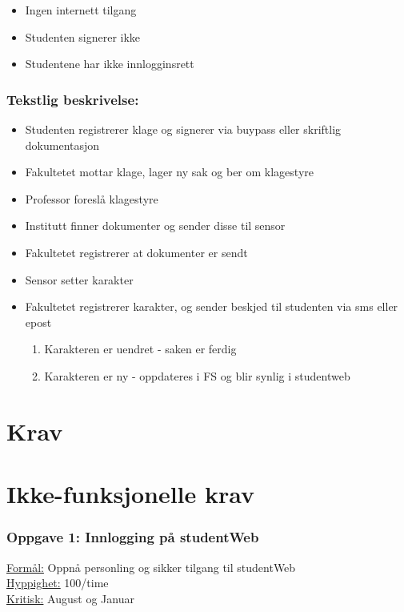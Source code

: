 \documentclass[12pt]{article}
\begin{document}
\begin{itemize}
\item Ingen internett tilgang
\item Studenten signerer ikke
\item Studentene har ikke innlogginsrett
\end{itemize}

\subsubsection*{Tekstlig beskrivelse:}

\begin{itemize}
\item Studenten registrerer klage og signerer via buypass eller skriftlig dokumentasjon
\item Fakultetet mottar klage, lager ny sak og ber om klagestyre
\item Professor foreslå klagestyre
\item Institutt finner dokumenter og sender disse til sensor
\item Fakultetet registrerer at dokumenter er sendt
\item Sensor setter karakter
\item Fakultetet registrerer karakter, og sender beskjed til studenten via sms eller epost
\begin{enumerate}
\item Karakteren er uendret - saken er ferdig
\item Karakteren er ny - oppdateres i FS og blir synlig i studentweb
\end{enumerate}
\end{itemize}


\section{Krav}

\section{Ikke-funksjonelle krav}

\subsubsection*{Oppgave 1: Innlogging på studentWeb}

\underline{Formål:} Oppnå personling og sikker tilgang til studentWeb\\
\underline{Hyppighet:} 100/time\\
\underline{Kritisk:} August og Januar
\end{document}
